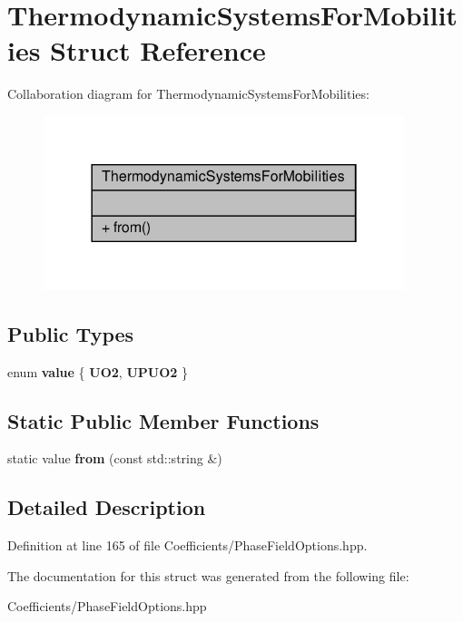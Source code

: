 \hypertarget{structThermodynamicSystemsForMobilities}{}\section{Thermodynamic\+Systems\+For\+Mobilities Struct Reference}
\label{structThermodynamicSystemsForMobilities}


Collaboration diagram for Thermodynamic\+Systems\+For\+Mobilities\+:\nopagebreak
\begin{figure}[H]
\begin{center}
\leavevmode
\includegraphics[width=298pt]{structThermodynamicSystemsForMobilities__coll__graph}
\end{center}
\end{figure}
\subsection*{Public Types}
\begin{DoxyCompactItemize}
\item 
\mbox{\label{structThermodynamicSystemsForMobilities_ad543f02fd17f277ba2960f8460d36d59}} 
enum {\bfseries value} \{ {\bfseries U\+O2}, 
{\bfseries U\+P\+U\+O2}
 \}
\end{DoxyCompactItemize}
\subsection*{Static Public Member Functions}
\begin{DoxyCompactItemize}
\item 
\mbox{\label{structThermodynamicSystemsForMobilities_a79b0960bb7d8b48abef37ed9053e5522}} 
static value {\bfseries from} (const std\+::string \&)
\end{DoxyCompactItemize}


\subsection{Detailed Description}


Definition at line 165 of file Coefficients/\+Phase\+Field\+Options.\+hpp.



The documentation for this struct was generated from the following file\+:\begin{DoxyCompactItemize}
\item 
Coefficients/\+Phase\+Field\+Options.\+hpp\end{DoxyCompactItemize}
